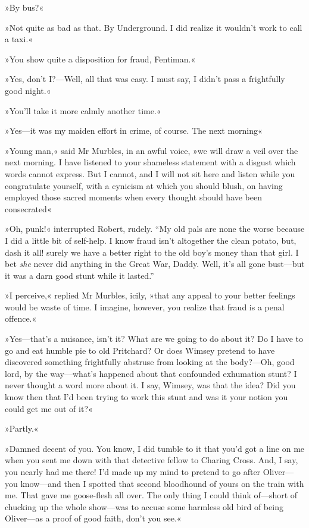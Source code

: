 »By bus?«

»Not quite as bad as that. By Underground. I did realize it wouldn't work to call a taxi.«

»You show quite a disposition for fraud, Fentiman.«

»Yes, don't I?---Well, all that was easy. I must say, I didn't pass a frightfully good night.«

»You'll take it more calmly another time.«

»Yes\allowbreak---\allowbreak it was my maiden effort in crime, of course. The next morning\longdash«

»Young man,« said Mr Murbles, in an awful voice, »we will draw a veil over the next morning. I have listened to your shameless statement with a disgust which words cannot express. But I cannot, and I will not sit here and listen while you congratulate yourself, with a cynicism at which you should blush, on having employed those sacred moments when every thought should have been consecrated\longdash«

»Oh, punk!« interrupted Robert, rudely. \enquote{My old pals are none the worse because I did a little bit of self-help. I know fraud isn't altogether the clean potato, but, dash it all! surely we have a better right to the old boy's money than that girl. I bet \textit{she} never did anything in the Great War, Daddy. Well, it's all gone bust\allowbreak---\allowbreak but it was a darn good stunt while it lasted.}

»I perceive,« replied Mr Murbles, icily, »that any appeal to your better feelings would be waste of time. I imagine, however, you realize that fraud is a penal offence.«

»Yes\allowbreak---\allowbreak that's a nuisance, isn't it? What are we going to do about it? Do I have to go and eat humble pie to old Pritchard? Or does Wimsey pretend to have discovered something frightfully abstruse from looking at the body?---Oh, good lord, by the way\allowbreak---\allowbreak what's happened about that confounded exhumation stunt? I never thought a word more about it. I say, Wimsey, was that the idea? Did you know then that I'd been trying to work this stunt and was it your notion you could get me out of it?«

»Partly.«

»Damned decent of you. You know, I did tumble to it that you'd got a line on me when you sent me down with that detective fellow to Charing Cross. And, I say, you nearly had me there! I'd made up my mind to pretend to go after Oliver\allowbreak---\allowbreak you know\allowbreak---\allowbreak and then I spotted that second bloodhound of yours on the train with me. That gave me goose-flesh all over. The only thing I could think of\allowbreak---\allowbreak short of chucking up the whole show\allowbreak---\allowbreak was to accuse some harmless old bird of being Oliver\allowbreak---\allowbreak as a proof of good faith, don't you see.«

